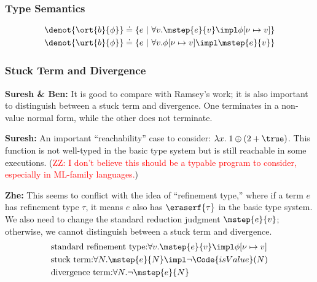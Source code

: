 \begin{frame}
    \frametitle{Type Semantics}

\begin{align*}
    \denot{ \ort{b}{\phi} } &\doteq \{ e ~|~ \forall v. \mstep{e}{v} \impl \phi[\nu\mapsto v] \} \\
    \denot{ \urt{b}{\phi} } &\doteq \{ e ~|~ \forall v. \phi[\nu\mapsto v] \impl \mstep{e}{v}  \}
\end{align*}
    
\end{frame}

\begin{frame}
    \frametitle{Stuck Term and Divergence}

\textbf{Suresh \& Ben:} It is good to compare with Ramsey's work; it is also important to distinguish between a stuck term and divergence. One terminates in a non-value normal form, while the other does not terminate.

\textbf{Suresh:} An important ``reachability'' case to consider: $\lambda x.\; 1 \oplus (2 + \true)$. This function is not well-typed in the basic type system but is still reachable in some executions. (\textcolor{red}{ZZ: I don't believe this should be a typable program to consider, especially in ML-family languages.})

\textbf{Zhe:} This seems to conflict with the idea of ``refinement type,'' where if a term $e$ has refinement type $\tau$, it means $e$ also has $\eraserf{\tau}$ in the basic type system. We also need to change the standard reduction judgment $\mstep{e}{v}$; otherwise, we cannot distinguish between a stuck term and divergence.
\begin{align*}
    &\text{standard refinement type:} \forall v. \mstep{e}{v} \impl \phi[\nu\mapsto v] \\
    &\text{stuck term:} \forall N. \mstep{e}{N} \impl \neg \Code{isValue}(N) \\
    &\text{divergence term:} \forall N. \neg \mstep{e}{N}
\end{align*}

\end{frame}


